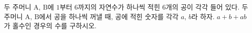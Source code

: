 \hspace*{2mm}\begin{minipage}[t]{\dimexpr\linewidth-2mm\relax}\vspace{0pt}
두 주머니 $\mathrm{A}$, $\mathrm{B}$에 $1$부터 $6$까지의 자연수가 하나씩 적힌 $6$개의 공이 각각 들어 있다. 두 주머니 $\mathrm{A}$, $\mathrm{B}$에서 공을 하나씩 꺼낼 때, 공에 적힌 숫자를 각각 $a$, $b$라 하자. $a+b+ab$가 홀수인 경우의 수를 구하시오.\end{minipage}
